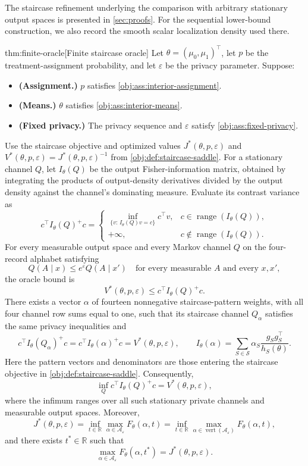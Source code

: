 \documentclass[11pt]{article}
\begin{document}
The staircase refinement underlying the comparison with arbitrary stationary output spaces is presented in \cref{sec:proofs}. For the sequential lower-bound construction, we also record the smooth scalar localization density used there.

\begin{theoremv}{thm:finite-oracle}[Finite staircase oracle]
Let \(\theta=(\mu_0,\mu_1)^\top\), let \(p\) be the treatment-assignment probability, and let \(\varepsilon\) be the privacy parameter. Suppose:
\begin{itemize}
\item \textbf{(Assignment.)} \(p\) satisfies \cref{obj:ass:interior-assignment}.
\item \textbf{(Means.)} \(\theta\) satisfies \cref{obj:ass:interior-means}.
\item \textbf{(Fixed privacy.)} The privacy sequence and \(\varepsilon\) satisfy \cref{obj:ass:fixed-privacy}.
\end{itemize}
Use the staircase objective and optimized values \(J^*(\theta,p,\varepsilon)\) and \(V^*(\theta,p,\varepsilon)=J^*(\theta,p,\varepsilon)^{-1}\) from \cref{obj:def:staircase-saddle}. For a stationary channel \(Q\), let \(I_\theta(Q)\) be the output Fisher-information matrix, obtained by integrating the products of output-density derivatives divided by the output density against the channel's dominating measure. Evaluate its contrast variance as
\[
c^\top I_\theta(Q)^+c
=
\begin{cases}
\displaystyle
\inf_{\{v:\,I_\theta(Q)v=c\}}c^\top v,
& c\in\operatorname{range}(I_\theta(Q)),\\
+\infty,
& c\notin\operatorname{range}(I_\theta(Q)).
\end{cases}
\]
For every measurable output space and every Markov channel \(Q\) on the four-record alphabet satisfying
\[
Q(A\mid x)\le e^\varepsilon Q(A\mid x')
\quad
\text{for every measurable }A\text{ and every }x,x',
\]
the oracle bound is
\[
V^*(\theta,p,\varepsilon)\le c^\top I_\theta(Q)^+c.
\]
There exists a vector \(\alpha\) of fourteen nonnegative staircase-pattern weights, with all four channel row sums equal to one, such that its staircase channel \(Q_\alpha\) satisfies the same privacy inequalities and
\[
c^\top I_\theta(Q_\alpha)^+c
=
c^\top I_\theta(\alpha)^+c
=
V^*(\theta,p,\varepsilon),
\qquad
I_\theta(\alpha)
=
\sum_{S\in\mathcal S}
\alpha_S\frac{g_Sg_S^\top}{h_S(\theta)}.
\]
Here the pattern vectors and denominators are those entering the staircase objective in \cref{obj:def:staircase-saddle}. Consequently,
\[
\inf_Q c^\top I_\theta(Q)^+c=V^*(\theta,p,\varepsilon),
\]
where the infimum ranges over all such stationary private channels and measurable output spaces. Moreover,
\[
J^*(\theta,p,\varepsilon)
=
\inf_{t\in\mathbb R}
\max_{\alpha\in\mathcal A_\varepsilon}F_\theta(\alpha,t)
=
\inf_{t\in\mathbb R}
\max_{\alpha\in\operatorname{vert}(\mathcal A_\varepsilon)}
F_\theta(\alpha,t),
\]
and there exists \(t^*\in\mathbb R\) such that
\[
\max_{\alpha\in\mathcal A_\varepsilon}
F_\theta(\alpha,t^*)
=
J^*(\theta,p,\varepsilon).
\]
\end{theoremv}
\end{document}

